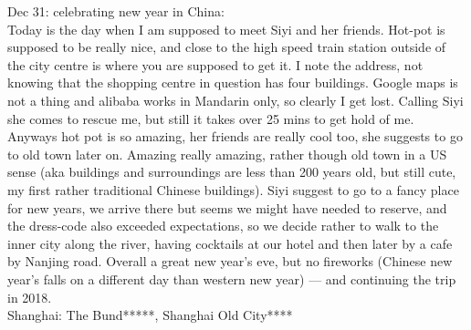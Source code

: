 Dec 31: celebrating new year in China:\\
Today is the day when I am supposed to meet Siyi and her friends. Hot-pot is supposed to be really nice, and close to the high speed train station outside of the city centre is where you are supposed to get it. I note the address, not knowing that the shopping centre in question has four buildings. Google maps is not a thing and alibaba works in Mandarin only, so clearly I get lost. Calling Siyi she comes to rescue me, but still it takes over 25 mins to get hold of me. Anyways hot pot is so amazing, her friends are really cool too, she suggests to go to old town later on. Amazing really amazing, rather though old town in a US sense (aka buildings and surroundings are less than 200 years old, but still cute, my first rather traditional Chinese buildings). Siyi suggest to go to a fancy place for new years, we arrive there but seems we might have needed to reserve, and the dress-code also exceeded expectations, so we decide rather to walk to the inner city along the river, having cocktails at our hotel and then later by a cafe by Nanjing road. Overall a great new year's eve, but no fireworks (Chinese new year's falls on a different day than western new year) --- and continuing the trip in 2018.\\

Shanghai: The Bund*****, Shanghai Old City****\\
